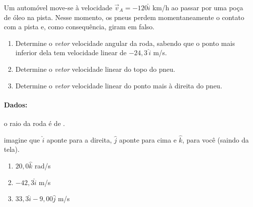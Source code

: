 \begin{question}
    Um automóvel move-se à velocidade \(\vec v_A = -120\hat i\) \unit{km/h} ao passar por uma poça de óleo na pista.
    Nesse momento, os pneus perdem momentaneamente o contato com a pista e, como consequência, giram em falso.
    \begin{enumerate}
      \item Determine o \emph{vetor} velocidade angular da roda, sabendo que o ponto mais inferior dela tem velocidade linear de \(-24,3\,\hat i\) \unit{m/s}.
      \item Determine o \emph{vetor} velocidade linear do topo do pneu.
      \item Determine o \emph{vetor} velocidade linear do ponto mais à direita do pneu.
    \end{enumerate}

    \paragraph{Dados:}
    \begin{compactitem}
      \item o raio da roda é de .
      \item imagine que $\hat i$ aponte para a direita, $\hat j$ aponte para cima e $\hat k$, para você (saindo da tela).
    \end{compactitem}

    \begin{answer}
      \begin{enumerate}
        \item $20,0\hat k$ \unit{rad/s}
        \item $-42,3\hat i$ \unit{m/s}
        \item $33,3\hat i - 9,00\hat j$ \unit{m/s}
      \end{enumerate}
    \end{answer}


\end{question}
